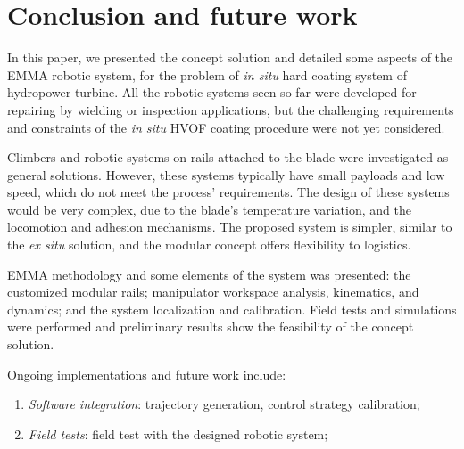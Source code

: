 \section{Conclusion and future work}

In this paper, we presented the concept solution and detailed some
aspects of the EMMA robotic system, for the problem of \textit{in situ} hard
coating system of hydropower turbine. All the robotic systems seen so far were
developed for repairing by wielding or inspection applications, but the
challenging requirements and constraints of the \textit{in situ} HVOF coating
procedure were not yet considered.

Climbers and robotic systems on rails attached to the blade were investigated as
general solutions. However, these systems typically have small payloads and
low speed, which do not meet the process' requirements. The design of these systems
would be very complex, due to the blade's temperature variation, and the
locomotion and adhesion mechanisms. The proposed system is simpler, similar to
the \textit{ex situ} solution, and the modular concept offers flexibility to
logistics.

EMMA methodology and some elements of the system was presented: the customized
modular rails; manipulator workspace analysis, kinematics, and dynamics; and
the system localization and calibration. Field tests and simulations were
performed and preliminary results show the feasibility of the concept solution.

Ongoing implementations and future work include:
\begin{enumerate}
  	\item \textit{Software integration}: trajectory generation, control strategy
  	calibration;
  	\item \textit{Field tests}: field test with the designed robotic system;
\end{enumerate}